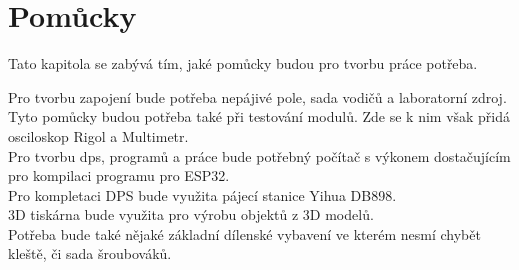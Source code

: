 \section{Pomůcky}
Tato kapitola se zabývá tím, jaké pomůcky budou pro tvorbu práce potřeba.
\newline

Pro tvorbu zapojení bude potřeba nepájivé pole, sada vodičů a laboratorní zdroj.\\
Tyto pomůcky budou potřeba také při testování modulů. Zde se k nim však přidá osciloskop Rigol a Multimetr.\\
Pro tvorbu \ac{dps}, programů a práce bude potřebný počítač s výkonem dostačujícím pro kompilaci programu pro ESP32.\\
Pro kompletaci DPS bude využita pájecí stanice Yihua DB898.\\
3D tiskárna bude využita pro výrobu objektů z 3D modelů.\\
Potřeba bude také nějaké základní dílenské vybavení ve kterém nesmí chybět kleště, či sada šroubováků.